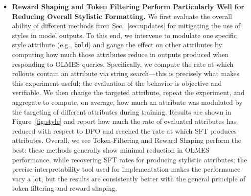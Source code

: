\documentclass{article} %
\begin{document}
\begin{itemize}[leftmargin=*]
    \item \textbf{Reward Shaping and Token Filtering Perform Particularly Well for Reducing Overall Stylistic Formatting.} We first evaluate the overall ability of different methods from Sec.~\ref{sec:updates} for mitigating the use of styles in model outputs.
    To this end, we intervene to modulate one specific style attribute (e.g., \texttt{bold}) and gauge the effect on other attributes by computing how much those attributes reduce in outputs produced when responding to OLMES queries.
    Specifically, we compute the rate at which rollouts contain an attribute via string search---this is precisely what makes this experiment useful; the evaluation of the behavior is objective and verifiable.
    We then change the targeted attribute, repeat the experiment, and aggregate to compute, on average, how much an attribute was modulated by the targeting of different attributes during training.
    Results are shown in Figure~\ref{fig:style} and report how much the rate of evaluated attributes has reduced with respect to DPO and reached the rate at which SFT produces attributes. 
    Overall, we see Token-Filtering and Reward Shaping perform the best: these methods generally show minimal reduction in OLMES performance, while recovering SFT rates for producing stylistic attributes; the precise interpretability tool used for implementation makes the performance vary a lot, but the results are consistently better with the general principle of token filtering and reward shaping.
    


\end{itemize}
\end{document}
